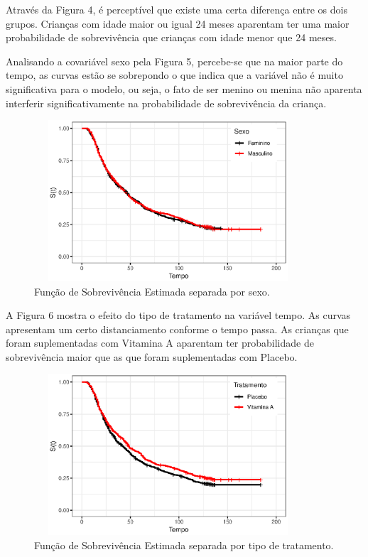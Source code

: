 \documentclass[a4paper,12pt]{article}
\begin{document}
Através da Figura 4, é perceptível que existe uma certa diferença entre os dois grupos. Crianças com idade maior ou igual 24 meses aparentam ter uma maior probabilidade de sobrevivência que crianças com idade menor que 24 meses.

Analisando a covariável sexo pela Figura 5, percebe-se que na maior parte do tempo, as curvas estão se sobrepondo o que indica que a variável não é muito significativa para o modelo, ou seja, o fato de ser menino ou menina não aparenta interferir significativamente na probabilidade de sobrevivência da criança.

\begin{figure}[H]
  \begin{center}
    \includegraphics[width=10cm, height = 6cm]{surv_sexo_vit}
    \caption{Função de Sobrevivência Estimada separada por sexo.}
  \end{center}
\end{figure}

A Figura 6 mostra o efeito do tipo de tratamento na variável tempo. As curvas apresentam um certo distanciamento conforme o tempo passa. As crianças que foram suplementadas com Vitamina A aparentam ter probabilidade de sobrevivência maior que as que foram suplementadas com Placebo.

\begin{figure}[H]
  \begin{center}
    \includegraphics[width=10cm, height = 6cm]{surv_trat_vit}
    \caption{Função de Sobrevivência Estimada separada por tipo de tratamento.}
  \end{center}
\end{figure}
\end{document}
